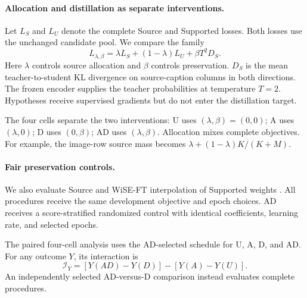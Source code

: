 \paragraph{Allocation and distillation as separate interventions.}
Let $L_S$ and $L_U$ denote the complete Source and Supported losses.
Both losses use the unchanged candidate pool.
We compare the family
\begin{equation}
L_{\lambda,\beta}
=\lambda L_S+(1-\lambda)L_U+\beta T^2D_S.
\label{eq:adobjective}
\end{equation}
Here $\lambda$ controls source allocation and $\beta$ controls preservation.
$D_S$ is the mean teacher-to-student KL divergence on source-caption columns in both directions.
The frozen encoder supplies the teacher probabilities at temperature $T=2$.
Hypotheses receive supervised gradients but do not enter the distillation target.

The four cells separate the two interventions:
U uses $(\lambda,\beta)=(0,0)$;
A uses $(\lambda,0)$;
D uses $(0,\beta)$;
AD uses $(\lambda,\beta)$.
Allocation mixes complete objectives.
For example, the image-row source mass becomes $\lambda+(1-\lambda)K/(K+M)$.

\paragraph{Fair preservation controls.}
We also evaluate Source and WiSE-FT interpolation of Supported weights \citep{wortsman2022wise}.
All procedures receive the same development objective and epoch choices.
AD receives a score-stratified randomized control with identical coefficients, learning rate, and selected epochs.

The paired four-cell analysis uses the AD-selected schedule for U, A, D, and AD.
For any outcome $Y$, its interaction is
\begin{equation}
\mathcal I_Y=[Y(AD)-Y(D)]-[Y(A)-Y(U)].
\label{eq:interaction}
\end{equation}
An independently selected AD-versus-D comparison instead evaluates complete procedures.
